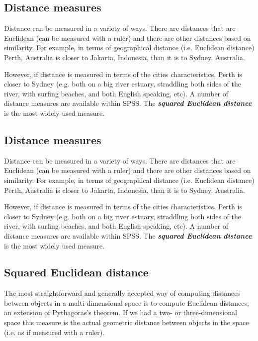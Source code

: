 \subsection{Distance measures}
Distance can be measured in a variety of ways. There are distances that are Euclidean (can be measured with a ruler) and there are other distances based on similarity. For example, in terms of
geographical distance (i.e. Euclidean distance) Perth, Australia is closer to Jakarta, Indonesia, than it is to Sydney, Australia.

However, if distance is measured in terms of the cities characteristics, Perth is closer to Sydney (e.g. both on a big river estuary, straddling both sides of the river, with surfing beaches, and both English speaking, etc). A number of distance measures are available within SPSS. The \textbf{\textit{squared Euclidean distance}} is the most widely used measure.
\subsection{Distance measures}
Distance can be measured in a variety of ways. There are distances that are Euclidean (can be measured with a ruler) and there are other distances based on similarity. For example, in terms of
geographical distance (i.e. Euclidean distance) Perth, Australia is closer to Jakarta, Indonesia, than it is to Sydney, Australia.

However, if distance is measured in terms of the cities characteristics, Perth is closer to Sydney (e.g. both on a big river estuary, straddling both sides of the river, with surfing beaches, and both English speaking, etc). A number of distance measures are available within SPSS. The \textbf{\textit{squared Euclidean distance}} is the most widely used measure.

\subsection{Squared Euclidean distance}

The most straightforward and generally accepted way of computing distances between objects in a multi-dimensional space is to compute Euclidean distances, an extension of Pythagoras's theorem.
If we had a two- or three-dimensional space this measure is the actual geometric distance between objects in the space (i.e. as if measured with a ruler).

